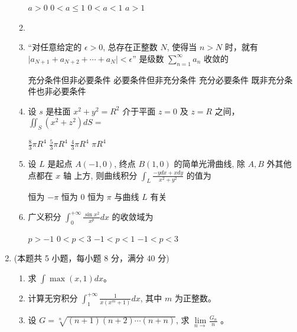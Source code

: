 \begin{enumerate}
\begin{enumerate}
	
\fourchoices
{$a>0$}
{$0<a \leqslant 1$}
{$0<a<1$}
{$a>1$}

\item 


\item
“对任意给定的 $\epsilon>0$, 总存在正整数 $N$, 使得当 $n>N$ 时，就有 $\mid a_{N+1}+a_{N+2}+\cdots+a_{N} \mid<\epsilon $” 是级数 $\sum\limits_{n=1}^{\infty} a_{n}$ 收敛的  


\fourchoices
{充分条件但非必要条件}
{必要条件但非充分条件}
{充分必要条件}
{既非充分条件也非必要条件}

	
\item 
设 $s$ 是柱面 $x^{2}+y^{2}=R^{2}$ 介于平面 $z=0$ 及 $z=R$ 之间， $\iint_{S}\left(x^{2}+z^{2}\right) d S=$  


\fourchoices
{$\frac{8}{3} \pi R^{4}$}
{$\frac{5}{3} \pi R^{4}$}
{$\frac{4}{3} \pi R^{4}$}
{$\pi R^{4}$}

\item 
设 $L$ 是起点 $A(-1,0)$, 终点 $B(1,0)$ 的简单光滑曲线, 除 $A, B$ 外其他点都在 $x$ 轴
上方, 则曲线积分 $\int_{L} \frac{-y d x+x d y}{x^{2}+y^{2}}$ 的值为  


\fourchoices
{恒为 $-\pi$}
{恒为 $ 0 $}
{恒为 $\pi$}
{与曲线 $L$ 有关}

\item 
广义积分 $\int_{0}^{+\infty} \frac{\sin x^{2}}{x^{p}} d x$ 的收敛域为  


\fourchoices
{$p>-1$}
{$0<p<3$}
{$-1<p<1$}
{$-1<p<3$}


	
	
\end{enumerate}

\item 
(本题共 5 小题，每小题 8 分，满分 40 分)
\begin{enumerate}
	\item
求 $\int \max (x, 1) d x$。
	
	
	\item
	计算无穷积分 $\int_{1}^{+\infty} \frac{1}{x\left(x^{m}+1\right)} d x$, 其中 $m$ 为正整数。
	
	
	\item
	设 $G=\sqrt[n]{(n+1)(n+2) \cdots(n+n)}$, 求 $\lim\limits _{n \rightarrow} \frac{G_{n}}{n}$ 。
	

\end{enumerate}
\end{enumerate}
